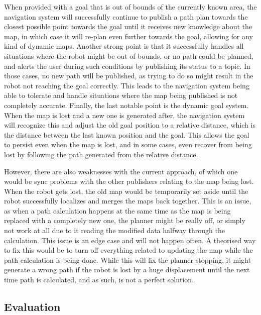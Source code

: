 \documentclass[10pt,english]{article}
\begin{document}
When provided with a goal that is out of bounds of the currently known area, the navigation system will successfully continue to publish a path plan towards the closest possible point towards the goal until it receives new knowledge about the map, in which case it will re-plan even further towards the goal, allowing for any kind of dynamic maps. Another strong point is that it successfully handles all situations where the robot might be out of bounds, or no path could be planned, and alerts the user during such conditions by publishing its status to a topic. In those cases, no new path will be published, as trying to do so might result in the robot not reaching the goal correctly. This leads to the navigation system being able to tolerate and handle situations where the map being published is not completely accurate. Finally, the last notable point is the dynamic goal system. When the map is lost and a new one is generated after, the navigation system will recognize this and adjust the old goal position to a relative distance, which is the distance between the last known position and the goal. This allows the goal to persist even when the map is lost, and in some cases, even recover from being lost by following the path generated from the relative distance.

However, there are also weaknesses with the current approach, of which one would be sync problems with the other publishers relating to the map being lost. When the robot gets lost, the old map would be temporarily set aside until the robot successfully localizes and merges the maps back together. This is an issue, as when a path calculation happens at the same time as the map is being replaced with a completely new one, the planner might be really off, or simply not work at all due to it reading the modified data halfway through the calculation. This issue is an edge case and will not happen often. A theorised way to fix this would be to turn off everything related to updating the map while the path calculation is being done. While this will fix the planner stopping, it might generate a wrong path if the robot is lost by a huge displacement until the next time path is calculated, and as such, is not a perfect solution.

\clearpage

\subsection*{Evaluation}

\end{document}

